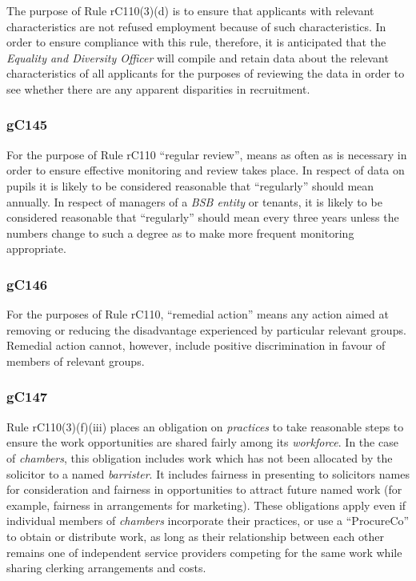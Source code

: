 The purpose of Rule rC110(3)(d) is to ensure that applicants with relevant
characteristics are not refused employment because of such
characteristics. In order to ensure compliance with this rule,
therefore, it is anticipated that the \emph{Equality and Diversity
Officer} will compile and retain data about the relevant characteristics
of all applicants for the purposes of reviewing the data in order to see
whether there are any apparent disparities in recruitment.

\subsubsection{\color{darkgrey}gC145}

For the purpose of Rule rC110 ``regular review'', means as often as is
necessary in order to ensure effective monitoring and review takes
place. In respect of data on pupils it is likely to be considered
reasonable that ``regularly'' should mean annually. In respect of
managers of a \emph{BSB entity} or tenants, it is likely to be
considered reasonable that ``regularly'' should mean every three years
unless the numbers change to such a degree as to make more frequent
monitoring appropriate.

\subsubsection{\color{darkgrey}gC146}

For the purposes of Rule rC110, ``remedial action'' means any action
aimed at removing or reducing the disadvantage experienced by particular
relevant groups. Remedial action cannot, however, include positive
discrimination in favour of members of relevant groups.

\subsubsection{\color{darkgrey}gC147}

Rule rC110(3)(f)(iii) places an obligation on \emph{practices} to take
reasonable steps to ensure the work opportunities are shared fairly
among its \emph{workforce}. In the case of \emph{chambers}, this
obligation includes work which has not been allocated by the solicitor
to a named \emph{barrister}. It includes fairness in presenting to
solicitors names for consideration and fairness in opportunities to
attract future named work (for example, fairness in arrangements for
marketing). These obligations apply even if individual members of
\emph{chambers} incorporate their practices, or use a ``ProcureCo'' to
obtain or distribute work, as long as their relationship between each
other remains one of independent service providers competing for the
same work while sharing clerking arrangements and costs.

